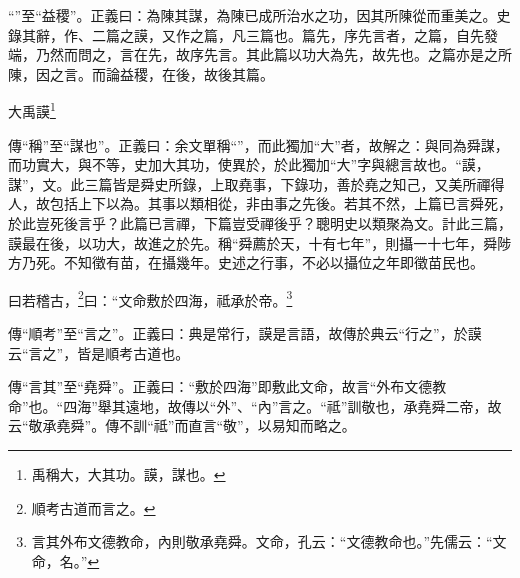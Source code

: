 {\noindent\shu{}\fzkt “”至“益稷”。正義曰：為陳其謀，為陳已成所治水之功，因其所陳從而重美之。史錄其辭，作、二篇之謨，又作之篇，凡三篇也。篇先，序先言者，之篇，自先發端，乃然而問之，言在先，故序先言。其此篇以功大為先，故先也。之篇亦是之所陳，因之言。而論益稷，在後，故後其篇。 \par}

大禹謨\footnote{禹稱大，大其功。謨，謀也。}

{\noindent\zhuan{}\fzbyks 傳“稱”至“謀也”。正義曰：余文單稱“”，而此獨加“大”者，故解之：與同為舜謀，而功實大，與不等，史加大其功，使異於，於此獨加“大”字與總言故也。“謨，謀”，文。此三篇皆是舜史所錄，上取堯事，下錄功，善於堯之知己，又美所禪得人，故包括上下以為。其事以類相從，非由事之先後。若其不然，上篇已言舜死，於此豈死後言乎？此篇已言禪，下篇豈受禪後乎？聰明史以類聚為文。計此三篇，謨最在後，以功大，故進之於先。稱“舜薦於天，十有七年”，則攝一十七年，舜陟方乃死。不知徵有苗，在攝幾年。史述之行事，不必以攝位之年即徵苗民也。 \par}

曰若稽古，\footnote{順考古道而言之。}曰：“文命敷於四海，祗承於帝。\footnote{言其外布文德教命，內則敬承堯舜。文命，孔云：“文德教命也。”先儒云：“文命，名。”}

{\noindent\zhuan{}\fzbyks 傳“順考”至“言之”。正義曰：典是常行，謨是言語，故傳於典云“行之”，於謨云“言之”，皆是順考古道也。 \par}

{\noindent\zhuan{}\fzbyks 傳“言其”至“堯舜”。正義曰：“敷於四海”即敷此文命，故言“外布文德教命”也。“四海”舉其遠地，故傳以“外”、“內”言之。“祗”訓敬也，承堯舜二帝，故云“敬承堯舜”。傳不訓“祗”而直言“敬”，以易知而略之。 \par}

